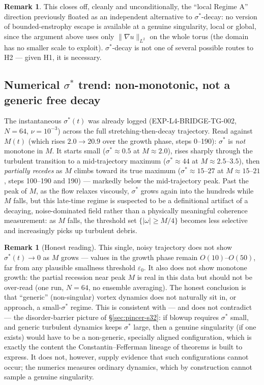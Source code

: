 \documentclass[11pt]{article}
\theoremstyle{definition}
\newtheorem{remark}[theorem]{Remark}
\theoremstyle{remark}
\begin{document}
\begin{remark}
  This closes off, cleanly and unconditionally, the ``local Regime A''
  direction previously floated as an independent alternative to
  $\sigma^*$-decay: no version of bounded-enstrophy escape is available at
  a genuine singularity, local or global, since the argument above uses
  only $\|\nabla u\|_{L^2}$ on the whole torus (the domain has no smaller
  scale to exploit). $\sigma^*$-decay is not one of several possible
  routes to H2 --- given H1, it is necessary.
\end{remark}

\subsection{Numerical $\sigma^*$ trend: non-monotonic, not a generic free decay}

The instantaneous $\sigma^*(t)$ was already logged (EXP-L4-BRIDGE-TG-002,
$N=64$, $\nu=10^{-3}$) across the full stretching-then-decay trajectory. Read
against $M(t)$ (which rises $2.0\to20.9$ over the growth phase, steps
0--190): $\sigma^*$ is \emph{not} monotone in $M$. It starts small
($\sigma^*\approx0.5$ at $M\approx2.0$), rises sharply through the
turbulent transition to a mid-trajectory maximum ($\sigma^*\approx44$ at
$M\approx2.5$--$3.5$), then \emph{partially recedes} as $M$ climbs toward
its true maximum ($\sigma^*\approx15$--$27$ at $M\approx15$--$21$, steps
100--190 and 190) --- markedly below the mid-trajectory peak. Past the
peak of $M$, as the flow relaxes viscously, $\sigma^*$ grows again into
the hundreds while $M$ falls, but this late-time regime is suspected to be
a definitional artifact of a decaying, noise-dominated field rather than a
physically meaningful coherence measurement: as $M$ falls, the threshold
set $\{|\omega|\geq M/4\}$ becomes less selective and increasingly picks
up turbulent debris.

\begin{remark}[Honest reading]
  This single, noisy trajectory does not show $\sigma^*(t)\to0$ as $M$
  grows --- values in the growth phase remain $O(10)$--$O(50)$, far from
  any plausible smallness threshold $\varepsilon_0$. It also does not show
  monotone growth: the partial recession near peak $M$ is real in this
  data but should not be over-read (one run, $N=64$, no ensemble
  averaging). The honest conclusion is that ``generic'' (non-singular)
  vortex dynamics does not naturally sit in, or approach, a small-$\sigma^*$
  regime. This is consistent with --- and does not contradict --- the
  disorder-barrier picture of \S\ref{sec:pincer-s32}: if blowup requires
  $\sigma^*$ small, and generic turbulent dynamics keeps $\sigma^*$ large,
  then a genuine singularity (if one exists) would have to be a
  non-generic, specially aligned configuration, which is exactly the
  content the Constantin--Fefferman lineage of theorems is built to
  express. It does not, however, supply evidence that such configurations
  cannot occur; the numerics measures ordinary dynamics, which by
  construction cannot sample a genuine singularity.
\end{remark}
\end{document}
